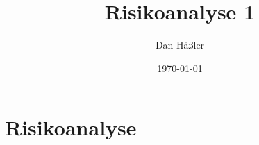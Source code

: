 \documentclass[a4paper, 12pt, oneside, openany, ngerman, onecolumn]{scrbook}
\title{Risikoanalyse 1}
\author{Dan Häßler}
\date{\today}
\begin{document}
\sloppy

\thispagestyle{empty}


\chapter*{Risikoanalyse}



\end{document}
